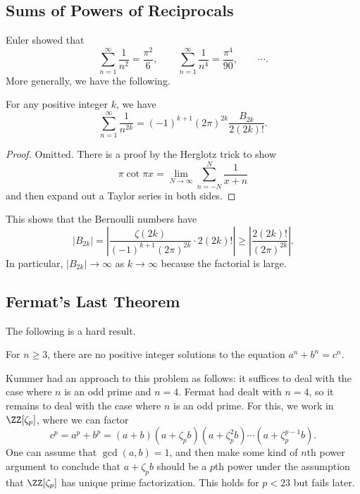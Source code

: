 \documentclass{article}
\begin{document}
\subsection{Sums of Powers of Reciprocals}
Euler showed that
\[\sum_{n=1}^\infty\frac1{n^2}=\frac{\pi^2}6,\qquad\sum_{n=1}^\infty\frac1{n^4}=\frac{\pi^4}{90},\qquad\cdots.\]
More generally, we have the following.
\begin{theorem}[Euler]
	For any positive integer $k$, we have
	\[\sum_{n=1}^\infty\frac1{n^{2k}}=(-1)^{k+1}(2\pi)^{2k}\frac{B_{2k}}{2(2k)!}.\]
\end{theorem}
\begin{proof}
	Omitted. There is a proof by the Herglotz trick to show
	\[\pi\cot\pi x=\lim_{N\to\infty}\sum_{n=-N}^N\frac1{x+n}\]
	and then expand out a Taylor series in both sides.
\end{proof}
\begin{remark}
	This shows that the Bernoulli numbers have
	\[|B_{2k}|=\left|\frac{\zeta(2k)}{(-1)^{k+1}(2\pi)^{2k}}\cdot2(2k)!\right|\ge\left|\frac{2(2k)!}{(2\pi)^{2k}}\right|.\]
	In particular, $|B_{2k}|\to\infty$ as $k\to\infty$ because the factorial is large.
\end{remark}

\subsection{Fermat's Last Theorem}
The following is a hard result.
\begin{theorem}[Wiles] \label{thm:fermat-last}
	For $n\ge3$, there are no positive integer solutions to the equation $a^n+b^n=c^n$.
\end{theorem}
Kummer had an approach to this problem as follows: it suffices to deal with the case where $n$ is an odd prime and $n=4$. Fermat had dealt with $n=4$, so it remains to deal with the case where $n$ is an odd prime. For this, we work in $\ZZ[\zeta_p]$, where we can factor
\[c^p=a^p+b^p=(a+b)(a+\zeta_pb)\left(a+\zeta_p^2b\right)\cdots\left(a+\zeta_p^{p-1}b\right).\]
One can assume that $\gcd(a,b)=1$, and then make some kind of $n$th power argument to conclude that $a+\zeta_pb$ should be a $p$th power under the assumption that $\ZZ[\zeta_p]$ has unique prime factorization. This holds for $p<23$ but fails later.
\end{document}
